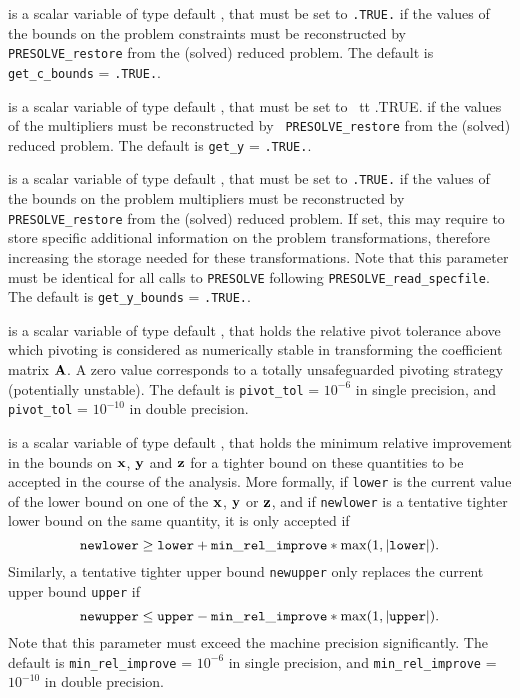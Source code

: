 \documentclass{galahad}
\newcommand{\packagename}{PRESOLVE}
\begin{document}
\begin{description}
 is a scalar variable of type default \logical, that
must be set to {\tt .TRUE.} if the values of the bounds on the
problem constraints must be reconstructed by {\tt \packagename\_restore}
from the (solved) reduced problem.
The default is {\tt get\_c\_bounds} = {\tt .TRUE.}.

 is a scalar variable of type default \logical, that
must be set to {\ tt .TRUE.} if the values of the multipliers
must be reconstructed by {\tt
\packagename\_restore} from the (solved) reduced problem.
The default is {\tt get\_y} = {\tt .TRUE.}.

 is a scalar variable of type default \logical, that
must be set to {\tt .TRUE.} if the values of the bounds on the
problem multipliers must be reconstructed by {\tt \packagename\_restore}
from the (solved) reduced problem.
If set, this may require to store specific
additional information on the problem transformations, 
therefore increasing the storage needed for these transformations. 
Note that this parameter must be identical for all calls to 
{\tt \packagename} following {\tt \packagename\_read\_specfile}. 
The default is {\tt get\_y\_bounds} = {\tt .TRUE.}.

 is a scalar variable of type default \realdp, that
holds the relative pivot tolerance above which pivoting is
considered as numerically stable in transforming the
coefficient matrix ${\mathbf{A}}$.  A zero value corresponds to a
totally unsafeguarded pivoting strategy (potentially unstable).
The default is {\tt pivot\_tol} = $10^{-6}$ in single precision, and
{\tt pivot\_tol} = $10^{-10}$ in double precision.

  is a scalar variable of type default
\realdp, that holds the minimum relative improvement in the bounds on ${\mathbf{x}}$,
${\mathbf{y}}$ and ${\mathbf{z}}$ for a tighter bound on these quantities to be 
accepted in the course of the analysis.  More formally, 
if {\tt lower} is the current value of the lower bound on one
of the ${\mathbf{x}}$, ${\mathbf{y}}$ or ${\mathbf{z}}$, and if {\tt newlower} is a tentative tighter
lower bound on the same quantity, it is only accepted if 
\[
{\tt newlower} \geq 
{\tt lower} + {\tt min\_rel\_improve} * \max( 1, |{\tt lower}|).
\]
Similarly, a tentative tighter upper bound {\tt newupper}
only replaces the current upper bound {\tt upper} if
\[
{\tt newupper} \leq 
{\tt upper} - {\tt min\_rel\_improve} * \max( 1, |{\tt upper}|).
\]
Note that this parameter must exceed the machine precision significantly.
The default is {\tt min\_rel\_improve} = $10^{-6}$ in single
precision, and {\tt min\_rel\_improve} = $10^{-10}$ in double
precision. 


\end{description}
\end{document}
